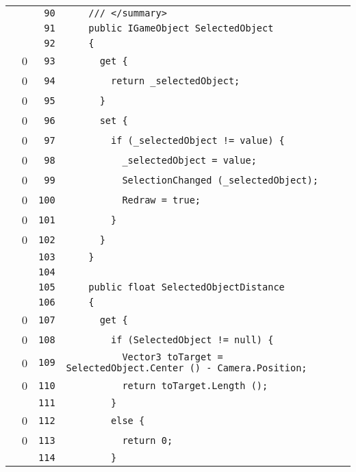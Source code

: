 \documentclass[a4paper,10pt]{article}
\begin{document}
\begin{longtable}[l]{lrrl}
\cellcolor{gray} &  & \verb~90~ & \verb~    /// </summary>~\\
\cellcolor{gray} &  & \verb~91~ & \verb~    public IGameObject SelectedObject~\\
\cellcolor{gray} &  & \verb~92~ & \verb~    {~\\
\cellcolor{red} & 0 & \verb~93~ & \verb~      get {~\\
\cellcolor{red} & 0 & \verb~94~ & \verb~        return _selectedObject;~\\
\cellcolor{red} & 0 & \verb~95~ & \verb~      }~\\
\cellcolor{red} & 0 & \verb~96~ & \verb~      set {~\\
\cellcolor{red} & 0 & \verb~97~ & \verb~        if (_selectedObject != value) {~\\
\cellcolor{red} & 0 & \verb~98~ & \verb~          _selectedObject = value;~\\
\cellcolor{red} & 0 & \verb~99~ & \verb~          SelectionChanged (_selectedObject);~\\
\cellcolor{red} & 0 & \verb~100~ & \verb~          Redraw = true;~\\
\cellcolor{red} & 0 & \verb~101~ & \verb~        }~\\
\cellcolor{red} & 0 & \verb~102~ & \verb~      }~\\
\cellcolor{gray} &  & \verb~103~ & \verb~    }~\\
\cellcolor{gray} &  & \verb~104~ & \verb~~\\
\cellcolor{gray} &  & \verb~105~ & \verb~    public float SelectedObjectDistance~\\
\cellcolor{gray} &  & \verb~106~ & \verb~    {~\\
\cellcolor{red} & 0 & \verb~107~ & \verb~      get {~\\
\cellcolor{red} & 0 & \verb~108~ & \verb~        if (SelectedObject != null) {~\\
\cellcolor{red} & 0 & \verb~109~ & \verb~          Vector3 toTarget = SelectedObject.Center () - Camera.Position;~\\
\cellcolor{red} & 0 & \verb~110~ & \verb~          return toTarget.Length ();~\\
\cellcolor{gray} &  & \verb~111~ & \verb~        }~\\
\cellcolor{red} & 0 & \verb~112~ & \verb~        else {~\\
\cellcolor{red} & 0 & \verb~113~ & \verb~          return 0;~\\
\cellcolor{gray} &  & \verb~114~ & \verb~        }~\\

\end{longtable}
\end{document}
